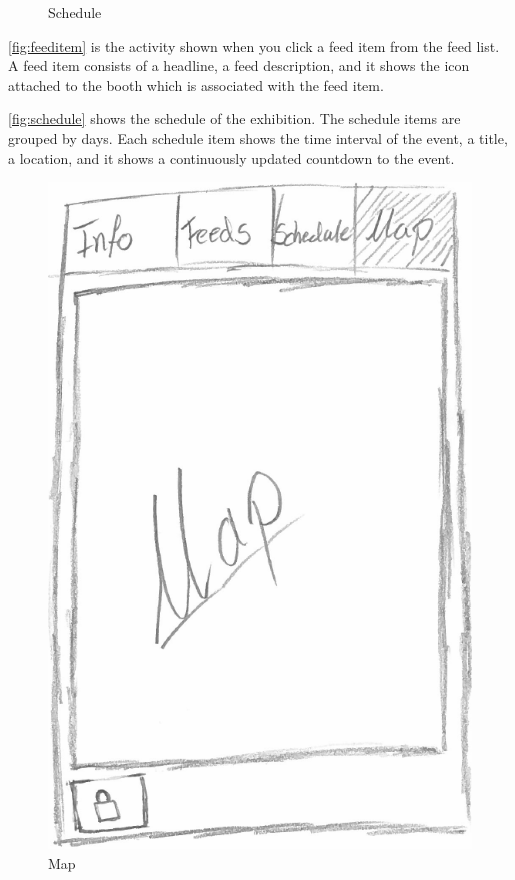\begin{figure}[H]
\begin{minipage}[b]{0.5\columnwidth}
\caption{Schedule\label{fig:schedule}}
\end{minipage}
\end{figure}

\autoref{fig:feeditem} is the activity shown when you click a feed item from the feed list. A feed item consists of a headline, a feed description, and it shows the icon attached to the booth which is associated with the feed item.

\autoref{fig:schedule} shows the schedule of the exhibition. The schedule items are grouped by days. Each schedule item shows the time interval of the event, a title, a location, and it shows a continuously updated countdown to the event.

\begin{figure}[H]
\begin{minipage}[b]{0.5\columnwidth}
\centering
\includegraphics[width=0.7\columnwidth]{img/prototype/7.png}
\caption{Map\label{fig:floorplan}}
\end{minipage}
\hspace{0.5cm}
\begin{minipage}[b]{0.5\columnwidth}
\centering

\end{minipage}
\end{figure}
